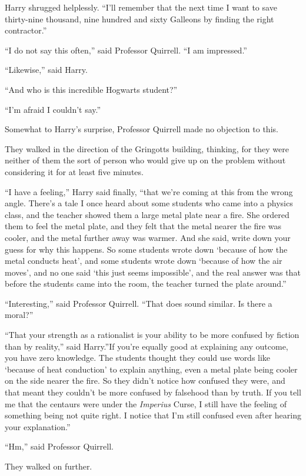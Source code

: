 Harry shrugged helplessly. ``I'll remember that the next time I want to
save thirty-nine thousand, nine hundred and sixty Galleons by finding
the right contractor.''

``I do not say this often,'' said Professor Quirrell. ``I am
impressed.''

``Likewise,'' said Harry.

``And who is this incredible Hogwarts student?''

``I'm afraid I couldn't say.''

Somewhat to Harry's surprise, Professor Quirrell made no objection to
this.

They walked in the direction of the Gringotts building, thinking, for
they were neither of them the sort of person who would give up on the
problem without considering it for at least five minutes.

``I have a feeling,'' Harry said finally, ``that we're coming at this
from the wrong angle. There's a tale I once heard about some students
who came into a physics class, and the teacher showed them a large metal
plate near a fire. She ordered them to feel the metal plate, and they
felt that the metal nearer the fire was cooler, and the metal further
away was warmer. And she said, write down your guess for why this
happens. So some students wrote down `because of how the metal conducts
heat', and some students wrote down `because of how the air moves', and
no one said `this just seems impossible', and the real answer was that
before the students came into the room, the teacher turned the plate
around.''

``Interesting,'' said Professor Quirrell. ``That does sound similar. Is
there a moral?''

``That your strength as a rationalist is your ability to be more
confused by fiction than by reality,'' said Harry.''If you're equally
good at explaining any outcome, you have zero knowledge. The students
thought they could use words like `because of heat conduction' to
explain anything, even a metal plate being cooler on the side nearer the
fire. So they didn't notice how confused they were, and that meant they
couldn't be more confused by falsehood than by truth. If you tell me
that the centaurs were under the \emph{Imperius} Curse, I still have the
feeling of something being not quite right. I notice that I'm still
confused even after hearing your explanation.''

``Hm,'' said Professor Quirrell.

They walked on further.

